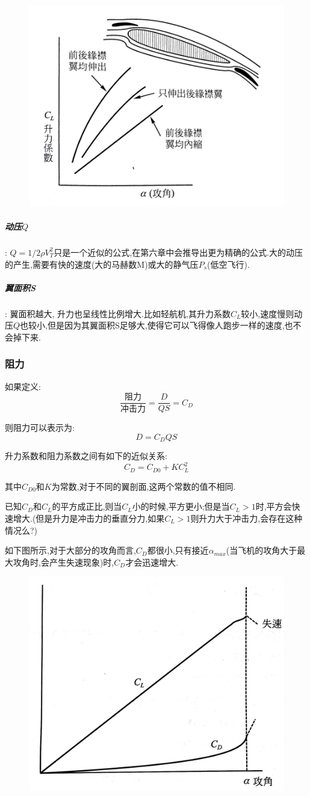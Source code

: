 \documentclass[9pt, oneside]{book}
\begin{document}
\begin{figure}[H]
    \centering
    \includegraphics[width=0.4\linewidth]{image/2-16.jpg}
\end{figure}

\subparagraph{动压$Q$}:
$Q = 1/2\rho V_T^2$只是一个近似的公式,在第六章中会推导出更为精确的公式.大的动压的产生,需要有快的速度(大的马赫数M)或大的静气压$P_s$(低空飞行).   

\subparagraph{翼面积S}:
翼面积越大, 升力也呈线性比例增大.比如轻航机,其升力系数$C_L$较小,速度慢则动压$Q$也较小,但是因为其翼面积S足够大,使得它可以飞得像人跑步一样的速度,也不会掉下来.

\subsubsection{阻力}

如果定义:
\begin{equation}
    \frac{\mbox{阻力}}{\mbox{冲击力}} = \frac{D}{QS} = C_D
\end{equation}

则阻力可以表示为:
\begin{equation}
    D = C_DQS
\end{equation}

升力系数和阻力系数之间有如下的近似关系:
\begin{equation}
    C_D = C_{D0} + KC_L^2
\end{equation}

其中$C_{D0}$和$K$为常数,对于不同的翼剖面,这两个常数的值不相同.

已知$C_D$和$C_L$的平方成正比,则当$C_L$小的时候,平方更小;但是当$C_L>1$时,平方会快速增大.\textcolor[rgb]{1,0,0}{(但是升力是冲击力的垂直分力,如果$C_L>1$则升力大于冲击力,会存在这种情况么?)}

如下图所示,对于大部分的攻角而言,$C_D$都很小,只有接近$\alpha_{max}$(当飞机的攻角大于最大攻角时,会产生失速现象)时,$C_D$才会迅速增大.

\begin{figure}[H]
    \centering
    \includegraphics[width=0.4\linewidth]{image/2-17.jpg}
\end{figure}
\end{document}
